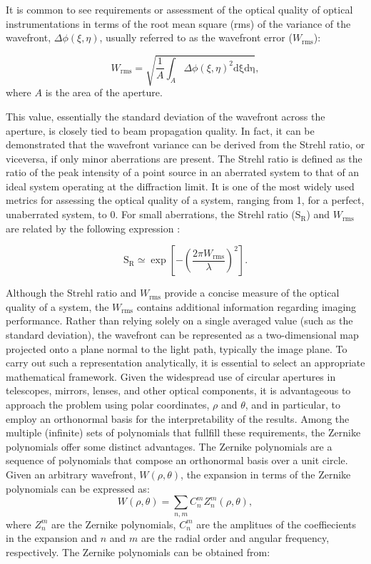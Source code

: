 It is common to see requirements or assessment of the optical quality of optical instrumentations in terms of the root mean square (rms) of the variance of the wavefront, $\Delta \phi (\xi, \eta)$, usually referred to as the wavefront error ($W_{\text{rms}}$):

\begin{equation}
  W_{\text{rms}} = \sqrt{\frac{1}{A}\int _ {A} \Delta \phi  \left(\xi, \eta \right) ^2 \mathrm{d \xi}\mathrm{d \eta}},
\end{equation}
where $A$ is the area of the aperture. 

This value, essentially the standard deviation of the wavefront across the aperture, is closely tied to beam propagation quality. In fact, it can be demonstrated that the wavefront variance can be derived from the Strehl ratio, or viceversa, if only minor aberrations are present. The Strehl ratio is defined as the ratio of the peak intensity of a point source in an aberrated system to that of an ideal system operating at the diffraction limit. It is one of the most widely used metrics for assessing the optical quality of a system, ranging from 1, for a perfect, unaberrated system, to 0. For small aberrations, the Strehl ratio ($\text{S}_\text{R}$) and $W_{\text{rms}}$ are related by the following expression \citep{WFE_def}: 

\begin{equation}
  \text{S}_\text{R} \simeq \exp \left[ - \left(\frac{2\pi W_{\text{rms}}}{\lambda}\right) ^2 \right].
\end{equation}

Although the Strehl ratio and $W_{\text{rms}}$ provide a concise measure of the optical quality of a system, the $W_{\text{rms}}$ contains additional information regarding imaging performance. Rather than relying solely on a single averaged value (such as the standard deviation), the wavefront can be represented as a two-dimensional map projected onto a plane normal to the light path, typically the image plane. To carry out such a representation analytically, it is essential to select an appropriate mathematical framework. Given the widespread use of circular apertures in telescopes, mirrors, lenses, and other optical components, it is advantageous to approach the problem using polar coordinates, $\rho$ and $\theta$, and in particular, to employ an orthonormal basis for the interpretability of the results. Among the multiple (infinite) sets of polynomials that fullfill these requirements, the Zernike polynomials \citep{Zernike} offer some distinct advantages. The Zernike polynomials are a sequence of polynomials that compose an orthonormal basis over a unit circle. Given an arbitrary wavefront, $W(\rho, \theta)$, the expansion in terms of the Zernike polynomials can be expressed as:
\begin{equation}
  W(\rho, \theta) = \sum_{n, m} C _n ^m Z _ n ^m(\rho, \theta),
\end{equation}
where $Z _n ^m$ are the Zernike polynomials, $C_n ^m$ are the amplitues of the coeffiecients in the expansion and $n$ and $m$ are the radial order and angular frequency, respectively. The Zernike polynomials can be obtained from:

